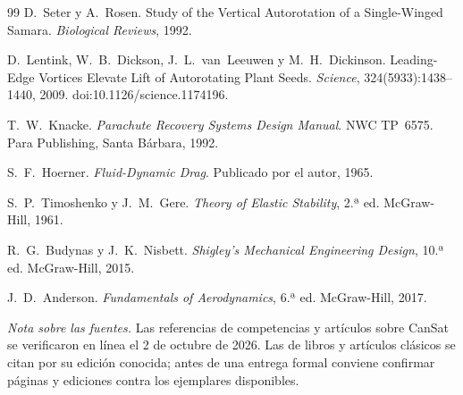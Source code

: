 \begin{thebibliography}{99}
 D.~Seter y A.~Rosen. Study of the Vertical Autorotation of a
  Single-Winged Samara. \emph{Biological Reviews}, 1992.

 D.~Lentink, W.~B.~Dickson, J.~L.~van~Leeuwen y M.~H.~Dickinson.
  Leading-Edge Vortices Elevate Lift of Autorotating Plant Seeds. \emph{Science},
  324(5933):1438--1440, 2009. doi:10.1126/science.1174196.

 T.~W.~Knacke. \emph{Parachute Recovery Systems Design Manual}.
  NWC TP~6575. Para Publishing, Santa Bárbara, 1992.

 S.~F.~Hoerner. \emph{Fluid-Dynamic Drag}. Publicado por el autor,
  1965.

 S.~P.~Timoshenko y J.~M.~Gere. \emph{Theory of Elastic
  Stability}, 2.ª ed. McGraw-Hill, 1961.

 R.~G.~Budynas y J.~K.~Nisbett. \emph{Shigley's Mechanical
  Engineering Design}, 10.ª ed. McGraw-Hill, 2015.

 J.~D.~Anderson. \emph{Fundamentals of Aerodynamics}, 6.ª ed.
  McGraw-Hill, 2017.












\end{thebibliography}

\noindent\small\textit{Nota sobre las fuentes.} Las referencias de competencias y
artículos sobre CanSat se verificaron en línea el 2 de octubre de 2026. Las de libros y
artículos clásicos se citan por su edición conocida; antes de una entrega formal conviene
confirmar páginas y ediciones contra los ejemplares disponibles.
